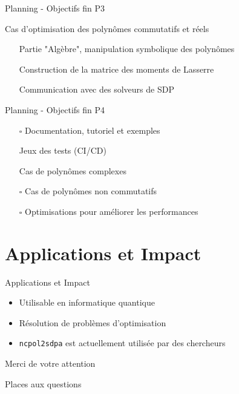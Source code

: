 \documentclass{beamer}
\begin{document}
\begin{frame}{Planning - Objectifs fin P3}

Cas d'optimisation des polynômes commutatifs et réels
\begin{itemize}
    \item[\checkmark] Partie "Algèbre", manipulation symbolique des polynômes
    \item[\checkmark] Construction de la matrice des moments de Lasserre
    \item[\checkmark] Communication avec des solveurs de SDP
\end{itemize}
\end{frame}

\begin{frame}{Planning - Objectifs fin P4}

\begin{itemize}
    \item[$\square$] Documentation, tutoriel et exemples
    \item[\checkmark] Jeux des tests (CI/CD)
    \item[\checkmark] Cas de polynômes complexes
    \item[$\square$] Cas de polynômes non commutatifs
    \item[$\square$] Optimisations pour améliorer les performances
\end{itemize}
\end{frame}

\section{Applications et Impact}

\begin{frame}{Applications et Impact}
\begin{itemize}
    \item Utilisable en informatique quantique
    \item Résolution de problèmes d'optimisation
    \item \texttt{ncpol2sdpa} est actuellement utilisée par des chercheurs
\end{itemize}
\end{frame}

\begin{frame}{Merci de votre attention}
\begin{center}
    {\Large Places aux questions}
\end{center}
\end{frame}
\end{document}
